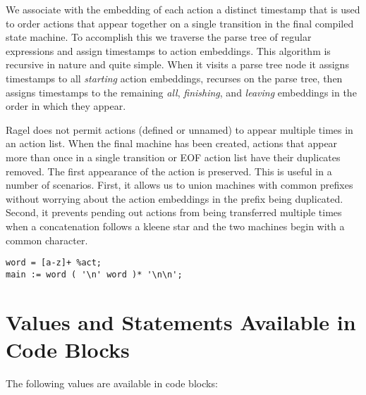 \documentclass[letterpaper,11pt,oneside]{book}
\newcommand{\verbspace}{\vspace{10pt}}
\begin{document}
We associate with the embedding of each action a distinct timestamp that is
used to order actions that appear together on a single transition in the final
compiled state machine. To accomplish this we traverse the parse tree of
regular expressions and assign timestamps to action embeddings. This algorithm
is recursive in nature and quite simple. When it visits a parse tree node it
assigns timestamps to all {\em starting} action embeddings, recurses on the
parse tree, then assigns timestamps to the remaining {\em all}, {\em
finishing}, and {\em leaving} embeddings in the order in which they appear.

Ragel does not permit actions (defined or unnamed) to appear multiple times in
an action list.  When the final machine has been created, actions that appear
more than once in a single transition or EOF action list have their duplicates
removed. The first appearance of the action is preserved. This is useful in a
number of scenarios.  First, it allows us to union machines with common
prefixes without worrying about the action embeddings in the prefix being
duplicated.  Second, it prevents pending out actions from being transferred multiple times
when a concatenation follows a kleene star and the two machines begin with a common
character.

\verbspace
\begin{verbatim}
word = [a-z]+ %act;
main := word ( '\n' word )* '\n\n';
\end{verbatim}

\section{Values and Statements Available in Code Blocks}
\label{vals}

\noindent The following values are available in code blocks:
\end{document}
